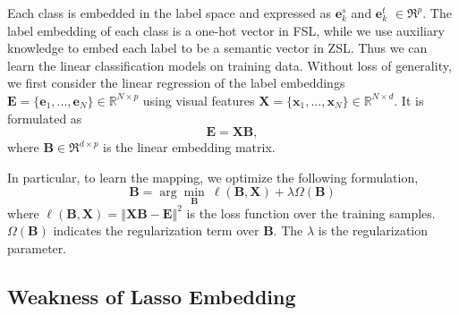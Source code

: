 \documentclass{article}
\begin{document}
Each class is embedded in the label space and expressed as $\mathbf{e}_{k}^{s}$
and $\mathbf{e}_{k}^{t}$ $\in\Re^{p}$. The label embedding of each
class is a one-hot vector in FSL, while we use auxiliary knowledge
\citet{lampert13AwAPAMI,transductiveEmbeddingJournal} to embed each
label to be a semantic vector in ZSL. Thus we can learn the linear
classification models on training data. Without loss of generality,
we first consider the linear regression of the label embeddings $\mathbf{E}=\{\mathbf{e}_{1},...,\mathbf{e}_{N}\}\in\mathbb{R}^{N\times p}$
using visual features $\mathbf{X}=\{\mathbf{x}_{1},...,\mathbf{x}_{N}\}\in\mathbb{R}^{N\times d}$.
It is formulated as
\begin{equation}
\mathbf{E}=\mathbf{X}\mathbf{B},
\end{equation}
where $\mathbf{B}\in\Re^{d\times p}$ is the linear embedding matrix.


In particular, to learn the mapping, we optimize the following formulation,
\begin{equation}
\bm{B}=\arg\min_{\bm{B}}\:\ell(\bm{B},\mathbf{X})+\lambda\Omega\left(\bm{B}\right)\label{eq:loss_function}
\end{equation}
where $\ell(\bm{B},\mathbf{X})=\left\Vert \mathbf{X}\mathbf{B}-\mathbf{E}\right\Vert ^{2}$
is the loss function over the training samples. $\Omega\left(\bm{B}\right)$
indicates the regularization term over $\mathbf{B}$. The $\lambda$
is the regularization parameter.


\subsection{Weakness of Lasso Embedding}
\end{document}

